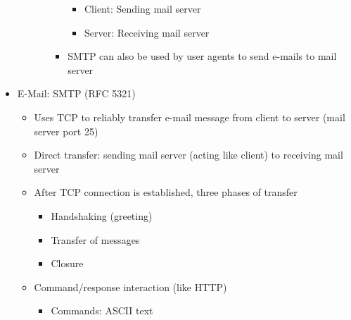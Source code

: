 \begin{itemize}
\begin{itemize}
\begin{enumerate}
\begin{itemize}
                \begin{itemize}

                  \item Client: Sending mail server

                  \item Server: Receiving mail server

                \end{itemize}

              \item SMTP can also be used by user agents to send e-mails to mail server

            \end{itemize}
            
        \end{enumerate}

    \end{itemize}

  \item E-Mail: SMTP (RFC 5321)

    \begin{itemize}

      \item Uses TCP to reliably transfer e-mail message from client to server (mail server port 25)

      \item Direct transfer: sending mail server (acting like client) to receiving mail server

      \item After TCP connection is established, three phases of transfer

        \begin{itemize}

          \item Handshaking (greeting)

          \item Transfer of messages

          \item Closure

        \end{itemize}

      \item Command/response interaction (like HTTP)

        \begin{itemize}

          \item Commands: ASCII text


\end{itemize}
\end{itemize}
\end{itemize}
